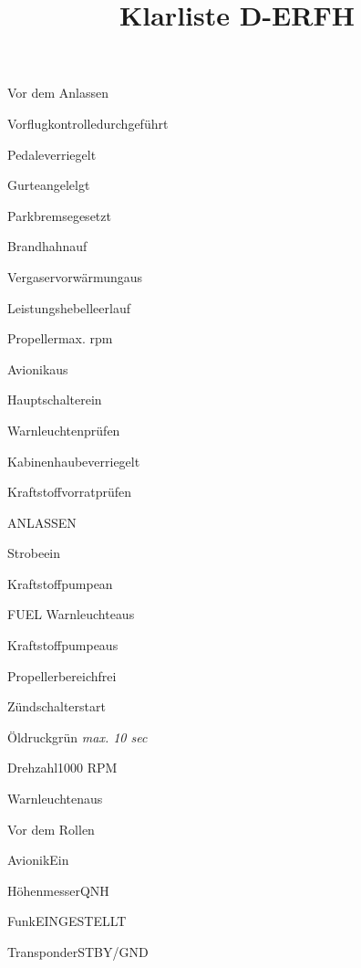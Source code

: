 \def\papersize{4}





\title{Klarliste D-ERFH}

  \begin{checklist}{Vor dem Anlassen}
    \item{Vorflugkontrolle}{durchgeführt}
    \item{Pedale}{verriegelt}
    \item{Gurte}{angelelgt}
    \item{Parkbremse}{gesetzt}
    \item{Brandhahn}{auf}
    \item{Vergaservorwärmung}{aus}
    \item{Leistungshebel}{leerlauf}
    \item{Propeller}{max. rpm}
    \item{Avionik}{aus}
    \item{Hauptschalter}{ein}
    \item{Warnleuchten}{prüfen}
    \item{Kabinenhaube}{verriegelt}
    \item{Kraftstoffvorrat}{prüfen}
  \end{checklist}

  \begin{checklist}{ANLASSEN}
    \item{Strobe}{ein}
    \item{Kraftstoffpumpe}{an}
    \item{FUEL Warnleuchte}{aus}
    \item{Kraftstoffpumpe}{aus}
    \item{Propellerbereich}{frei}
    \item{Zündschalter}{start}
    \item{Öldruck}{grün \textit{max. 10 sec}}
    \item{Drehzahl}{1000 RPM}
    \item{Warnleuchten}{aus}
  \end{checklist}

  \begin{checklist}{Vor dem Rollen}
    \item{Avionik}{Ein}
    \item{Höhenmesser}{QNH}
    \item{Funk}{EINGESTELLT}
    \item{Transponder}{STBY/GND}
  \end{checklist}

